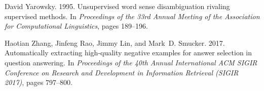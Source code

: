 \documentclass[11pt,a4paper]{article}
\begin{document}
\begin{thebibliography}{24}
David Yarowsky. 1995.
\newblock Unsupervised word sense disambiguation rivaling supervised methods.
\newblock In \emph{Proceedings of the 33rd Annual Meeting of the Association
  for Computational Linguistics}, pages 189--196.

Haotian Zhang, Jinfeng Rao, Jimmy Lin, and Mark~D. Smucker. 2017.
\newblock Automatically extracting high-quality negative examples for answer
  selection in question answering.
\newblock In \emph{Proceedings of the 40th Annual International ACM SIGIR
  Conference on Research and Development in Information Retrieval (SIGIR
  2017)}, pages 797--800.

\end{thebibliography}
\end{document}
